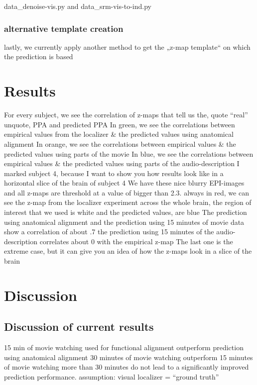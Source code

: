 data\_denoise-vis.py and data\_srm-vis-to-ind.py


\subsubsection{alternative template creation}
%
lastly, we currently apply another method to get the „z-map template“ on which
the prediction is based


\section{Results}
%
For every subject, we see the correlation of z-maps that tell us the, quote
``real'' unquote, PPA and predicted PPA
%
In green, we see the correlations between empirical values from the localizer \&
the predicted values using anatomical alignment
%
In orange, we see the correlations between empirical values \& the predicted
values using parts of the movie
%
In blue, we see the correlations between empirical values \& the predicted
values using parts of the audio-description
%
I marked subject 4, because I want to show you how results look like in a
horizontal slice of the brain of subject 4
%
We have these nice blurry EPI-images and all z-maps are threshold at a value of
bigger than 2.3.
%
always in red, we can see the z-map from the localizer experiment across the
whole brain,
%
the region of interest that we used is white and the predicted values, are blue
%
The prediction using anatomical alignment and the prediction using 15 minutes of
movie data show a correlation of about .7
%
the prediction using 15 minutes of the audio-description correlates about 0 with
the empirical z-map
%
The last one is the extreme case, but it can give you an idea of how the z-maps
look in a slice of the brain



\section{Discussion}


\subsection{Discussion of current results}
%
15 min of movie watching used for functional alignment outperform prediction
using anatomical alignment
%
30 minutes of movie watching outperform 15 minutes of movie watching
%
more than 30 minutes do not lead to a significantly improved prediction
performance.
%
assumption: visual localizer = ``ground truth''


